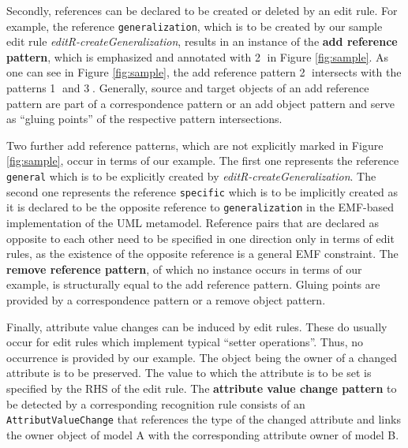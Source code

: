 \documentclass{llncs}
\begin{document}
Secondly, references can be declared to be created or deleted
by an edit rule.
For example, the reference \texttt{generalization}, which is to be created by
our sample edit rule
\textit{editR-createGeneralization}, results in an instance of
the \textbf{add reference pattern}, which is emphasized and
annotated with \textcircled{2} in Figure \ref{fig:sample}.
As one can see in Figure \ref{fig:sample}, the add reference
pattern \textcircled{2} intersects with the patterns \textcircled{1} and
\textcircled{3}.
Generally, source and target objects of an add reference pattern are part of
a correspondence pattern or an add object pattern and serve
as ``gluing points'' of the respective pattern intersections.

Two further add reference patterns, which are not explicitly
marked in Figure \ref{fig:sample}, occur in terms of our example.
The first one represents the reference \texttt{general} which is to be 
explicitly created by \textit{editR-createGeneralization}.
The second one represents the reference \texttt{specific}
which is to be implicitly created as it is declared to be
the opposite reference to \texttt{generalization} in
the EMF-based implementation of the UML metamodel. 
Reference pairs that are declared as opposite to each
other need to be specified in one direction only in terms of
edit rules, as the existence of the opposite reference is a 
general EMF constraint.
The \textbf{remove reference pattern}, of which no instance 
occurs in terms of our example,
is structurally equal to the add reference pattern. Gluing points
are provided by a correspondence pattern or a remove object pattern.

Finally, attribute value changes can be induced by edit rules. 
These do usually occur for edit rules which implement typical 
``setter operations''. Thus, no occurrence is provided
by our example.
The object being the owner of a changed attribute is to
be preserved.
The value to which the attribute is to be set is specified by 
the RHS of the edit rule. 
The \textbf{attribute value change pattern} to be detected by 
a corresponding recognition rule consists of an 
\texttt{AttributValueChange} that references the type of the changed 
attribute and links the owner object of model A with the
corresponding attribute owner of model B. 
\end{document}
